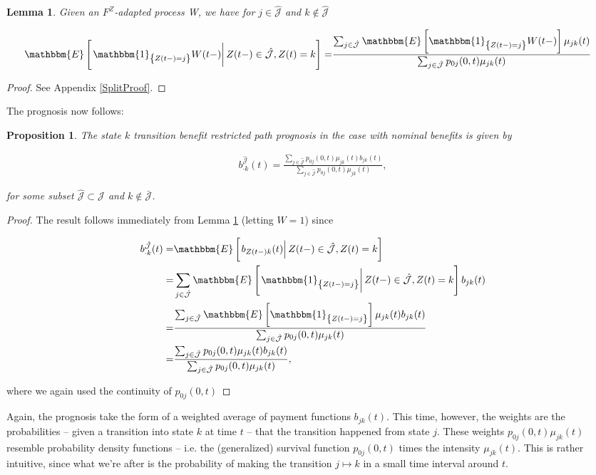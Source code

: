 \documentclass{article}
\newcommand{\1}[1]{\mathbbm{1}_{\left\lbrace #1 \right\rbrace}}
\newcommand{\expec}[1][def]{\mathbbm{E} \left[ #1 \right]}
\newcommand{\econd}[2][def]{\mathbbm{E} \left[ \left. #1 \right| #2 \right]}
\theoremstyle{break}
\newtheorem{proposition}[definition]{Proposition}%
\newtheorem{lemma}[definition]{Lemma}
\theoremstyle{remark}
\numberwithin{equation}{section}
\begin{document}
\begin{lemma} \label{Split}
	Given an $F^Z$-adapted process W, we have for $j \in \hat{\mathcal{J}}$ and $k \notin \hat{\mathcal{J}}$
	
	\begin{align*}
		\econd[\1{Z(t-)=j} W(t-)]{Z(t-) \in \hat{\mathcal{J}}, Z(t) = k} =& \frac{\sum_{j \in \hat{\mathcal{J}}} \expec[\1{Z(t-)=j} W(t-)] \mu_{jk}(t)}{\sum_{j \in \hat{\mathcal{J}}} p_{0j}(0,t) \mu_{jk}(t)}
	\end{align*}
\end{lemma}
\begin{proof}
	See Appendix \ref{SplitProof}.
\end{proof}

The prognosis now follows:

\begin{proposition} \label{TransitionWithoutBonus}
The state $k$ transition benefit restricted path prognosis in the case with nominal benefits is given by

\begin{align*}
    b^{\hat{\mathcal{J}}}_{\cdot k}(t) = \frac{\sum_{j \in \hat{\mathcal{J}}} p_{0j}(0,t) \mu_{jk}(t) b_{jk}(t)}{\sum_{j \in \hat{\mathcal{J}}} p_{0j}(0,t) \mu_{jk}(t)},
\end{align*}

for some subset $\hat{\mathcal{J}} \subset \mathcal{J}$ and $k \notin \bar{\mathcal{J}}$.
\end{proposition}
\begin{proof}
The result follows immediately from Lemma \ref{Split} (letting $W=1$) since

\begin{align*}
	b^{\hat{\mathcal{J}}}_{\cdot k}(t) =& \econd[b_{Z(t-)k}(t)]{Z(t-) \in \hat{\mathcal{J}}, Z(t)=k} \\
	=& \sum_{j \in \hat{\mathcal{J}}} \econd[\1{Z(t-)=j}]{Z(t-) \in \hat{\mathcal{J}}, Z(t) = k} b_{jk}(t) \\
	=&\frac{\sum_{j \in \hat{\mathcal{J}}} \expec[\1{Z(t-)=j}] \mu_{jk}(t) b_{jk}(t)}{\sum_{j \in \hat{\mathcal{J}}} p_{0j}(0,t) \mu_{jk}(t)} \\
	=&\frac{\sum_{j \in \hat{\mathcal{J}}} p_{0j}(0,t) \mu_{jk}(t) b_{jk}(t)}{\sum_{j \in \hat{\mathcal{J}}} p_{0j}(0,t) \mu_{jk}(t)},
\end{align*}

where we again used the continuity of $p_{0j}(0,t)$
\end{proof}

Again, the prognosis take the form of a weighted average of payment functions $b_{jk}(t)$. This time, however, the weights are the probabilities -- given a transition into state $k$ at time $t$ -- that the transition happened from state $j$. These weights $p_{0j}(0,t) \mu_{jk}(t)$ resemble probability density functions -- i.e. the (generalized) survival function $p_{0j}(0,t)$ times the intensity $\mu_{jk}(t)$. This is rather intuitive, since what we're after is the probability of making the transition $j \mapsto k$ in a small time interval around $t$.
\end{document}
